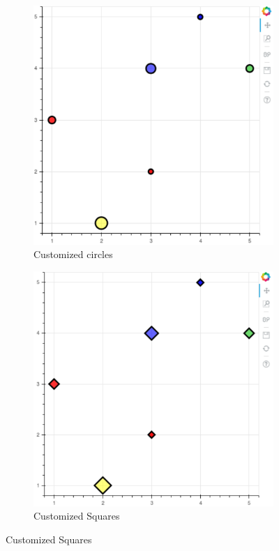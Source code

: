 \begin{figure}
\begin{subfigure}{.33\textwidth}
            \includegraphics[width=.9\linewidth]{BokehFigs/colored_circles.pdf}
            \caption{Customized circles}
            \label{fig:circles}
    \end{subfigure}%
    \begin{subfigure}{.33\textwidth}
        \centering
            \includegraphics[width=.9\linewidth]{BokehFigs/squares.pdf}
            \caption{Customized Squares}
            \label{fig:circles}
    \end{subfigure}

\end{figure}

